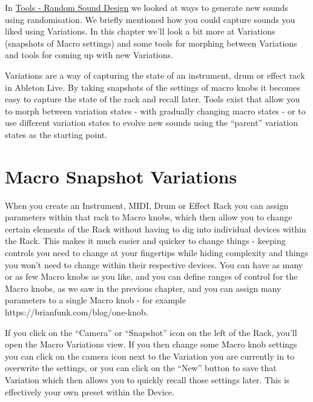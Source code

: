 \documentclass[
  12pt,
  letterpaper,
  oneside,
  open=any]{scrbook}
\begin{document}
In \hyperref[Chapter-024-Tool-Random_Sound_Design]{Tools - Random Sound
Design} we looked at ways to generate new sounds using randomisation. We
briefly mentioned how you could capture sounds you liked using
Variations. In this chapter we'll look a bit more at Variations
(snapshots of Macro settings) and some tools for morphing between
Variations and tools for coming up with new Variations.

\begin{tcolorbox}[enhanced jigsaw, arc=.35mm, title=\textcolor{quarto-callout-tip-color}{\faLightbulb}\hspace{0.5em}{Key idea}, colback=white, opacitybacktitle=0.6, coltitle=black, toptitle=1mm, colframe=quarto-callout-tip-color-frame, bottomtitle=1mm, titlerule=0mm, rightrule=.15mm, bottomrule=.15mm, colbacktitle=quarto-callout-tip-color!10!white, toprule=.15mm, breakable, opacityback=0, left=2mm, leftrule=.75mm]

Variations are a way of capturing the state of an instrument, drum or
effect rack in Ableton Live. By taking snapshots of the settings of
macro knobs it becomes easy to capture the state of the rack and recall
later. Tools exist that allow you to morph between variation states -
with gradually changing macro states - or to use different variation
states to evolve new sounds using the ``parent'' variation states as the
starting point.

\end{tcolorbox}

\section{Macro Snapshot Variations}\label{macro-snapshot-variations}

When you create an Instrument, MIDI, Drum or Effect Rack you can assign
parameters within that rack to Macro knobs, which then allow you to
change certain elements of the Rack without having to dig into
individual devices within the Rack. This makes it much easier and
quicker to change things - keeping controls you need to change at your
fingertips while hiding complexity and things you won't need to change
within their respective devices. You can have as many or as few Macro
knobs as you like, and you can define ranges of control for the Macro
knobs, as we saw in the previous chapter, and you can assign many
parameters to a single Macro knob - for example
https://brianfunk.com/blog/one-knob.

If you click on the ``Camera'' or ``Snapshot'' icon on the left of the
Rack, you'll open the Macro Variations view. If you then change some
Macro knob settings you can click on the camera icon next to the
Variation you are currently in to overwrite the settings, or you can
click on the ``New'' button to save that Variation which then allows you
to quickly recall those settings later. This is effectively your own
preset within the Device.
\end{document}
